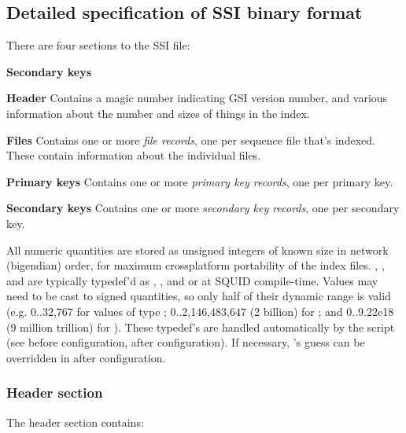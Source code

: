 \documentclass[12pt]{report}
\begin{document}
\subsection{Detailed specification of SSI binary format}

There are four sections to the SSI file:
\begin{sreitems}{\textbf{Secondary keys}}
\item[\textbf{Header}] 
Contains a magic number indicating GSI version number, and 
various information about the number and sizes of things in the index.

\item[\textbf{Files}]
Contains one or more \emph{file records}, one per sequence file that's
indexed. These contain information about the individual files.

\item[\textbf{Primary keys}]
Contains one or more \emph{primary key records}, one per primary key.

\item[\textbf{Secondary keys}]
Contains one or more \emph{secondary key records}, one per secondary key.
\end{sreitems}

All numeric quantities are stored as unsigned integers of known size
in network (bigendian) order, for maximum crossplatform portability of
the index files. , , and
 are typically typedef'd as ,
, and  or  at SQUID compile-time. Values may need to be cast to signed
quantities, so only half of their dynamic range is valid
(e.g. 0..32,767 for values of type ;
0..2,146,483,647 (2 billion) for ; and 0..9.22e18 (9
million trillion) for ).  These typedef's are
handled automatically by the  script (see
 before configuration,  after
configuration). If necessary, 's guess can be
overridden in  after configuration.

\subsubsection{Header section}

The header section contains:
\end{document}

